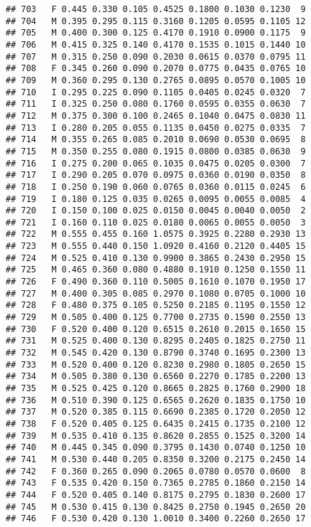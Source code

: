 \documentclass[
]{article}
\begin{document}
\begin{verbatim}
## 703   F 0.445 0.330 0.105 0.4525 0.1800 0.1030 0.1230  9
## 704   M 0.395 0.295 0.115 0.3160 0.1205 0.0595 0.1105 12
## 705   M 0.400 0.300 0.125 0.4170 0.1910 0.0900 0.1175  9
## 706   M 0.415 0.325 0.140 0.4170 0.1535 0.1015 0.1440 10
## 707   M 0.315 0.250 0.090 0.2030 0.0615 0.0370 0.0795 11
## 708   F 0.345 0.260 0.090 0.2070 0.0775 0.0435 0.0765 10
## 709   M 0.360 0.295 0.130 0.2765 0.0895 0.0570 0.1005 10
## 710   I 0.295 0.225 0.090 0.1105 0.0405 0.0245 0.0320  7
## 711   I 0.325 0.250 0.080 0.1760 0.0595 0.0355 0.0630  7
## 712   M 0.375 0.300 0.100 0.2465 0.1040 0.0475 0.0830 11
## 713   I 0.280 0.205 0.055 0.1135 0.0450 0.0275 0.0335  7
## 714   M 0.355 0.265 0.085 0.2010 0.0690 0.0530 0.0695  8
## 715   M 0.350 0.255 0.080 0.1915 0.0800 0.0385 0.0630  9
## 716   I 0.275 0.200 0.065 0.1035 0.0475 0.0205 0.0300  7
## 717   I 0.290 0.205 0.070 0.0975 0.0360 0.0190 0.0350  8
## 718   I 0.250 0.190 0.060 0.0765 0.0360 0.0115 0.0245  6
## 719   I 0.180 0.125 0.035 0.0265 0.0095 0.0055 0.0085  4
## 720   I 0.150 0.100 0.025 0.0150 0.0045 0.0040 0.0050  2
## 721   I 0.160 0.110 0.025 0.0180 0.0065 0.0055 0.0050  3
## 722   M 0.555 0.455 0.160 1.0575 0.3925 0.2280 0.2930 13
## 723   M 0.555 0.440 0.150 1.0920 0.4160 0.2120 0.4405 15
## 724   M 0.525 0.410 0.130 0.9900 0.3865 0.2430 0.2950 15
## 725   M 0.465 0.360 0.080 0.4880 0.1910 0.1250 0.1550 11
## 726   F 0.490 0.360 0.110 0.5005 0.1610 0.1070 0.1950 17
## 727   M 0.400 0.305 0.085 0.2970 0.1080 0.0705 0.1000 10
## 728   F 0.480 0.375 0.105 0.5250 0.2185 0.1195 0.1550 12
## 729   M 0.505 0.400 0.125 0.7700 0.2735 0.1590 0.2550 13
## 730   F 0.520 0.400 0.120 0.6515 0.2610 0.2015 0.1650 15
## 731   M 0.525 0.400 0.130 0.8295 0.2405 0.1825 0.2750 11
## 732   M 0.545 0.420 0.130 0.8790 0.3740 0.1695 0.2300 13
## 733   M 0.520 0.400 0.120 0.8230 0.2980 0.1805 0.2650 15
## 734   M 0.505 0.380 0.130 0.6560 0.2270 0.1785 0.2200 13
## 735   M 0.525 0.425 0.120 0.8665 0.2825 0.1760 0.2900 18
## 736   M 0.510 0.390 0.125 0.6565 0.2620 0.1835 0.1750 10
## 737   M 0.520 0.385 0.115 0.6690 0.2385 0.1720 0.2050 12
## 738   F 0.520 0.405 0.125 0.6435 0.2415 0.1735 0.2100 12
## 739   M 0.535 0.410 0.135 0.8620 0.2855 0.1525 0.3200 14
## 740   M 0.445 0.345 0.090 0.3795 0.1430 0.0740 0.1250 10
## 741   M 0.530 0.440 0.205 0.8350 0.3200 0.2175 0.2450 14
## 742   F 0.360 0.265 0.090 0.2065 0.0780 0.0570 0.0600  8
## 743   F 0.535 0.420 0.150 0.7365 0.2785 0.1860 0.2150 14
## 744   F 0.520 0.405 0.140 0.8175 0.2795 0.1830 0.2600 17
## 745   M 0.530 0.415 0.130 0.8425 0.2750 0.1945 0.2650 20
## 746   F 0.530 0.420 0.130 1.0010 0.3400 0.2260 0.2650 17

\end{verbatim}
\end{document}
